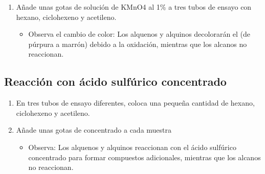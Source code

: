     \begin{enumerate}
        \item Añade unas gotas de solución de KMnO4 al 1\% a tres tubos de ensayo con hexano, ciclohexeno y acetileno.
        \begin{itemize}
            \item Observa el cambio de color: Los alquenos y alquinos decolorarán el  (de púrpura a marrón) debido a la oxidación, mientras que los alcanos no reaccionan.
        \end{itemize}
    \end{enumerate}
    
\subsection{Reacción con ácido sulfúrico concentrado}

    \begin{enumerate}
        \item En tres tubos de ensayo diferentes, coloca una pequeña cantidad de hexano, ciclohexeno y acetileno.
        \item Añade unas gotas de  concentrado a cada muestra
        \begin{itemize}
            \item Observa: Los alquenos y alquinos reaccionan con el ácido sulfúrico concentrado para formar compuestos adicionales, mientras que los alcanos no reaccionan.
        \end{itemize}
    \end{enumerate}